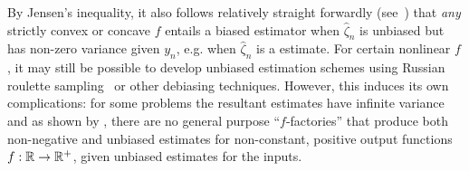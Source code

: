 By Jensen's inequality, it also follows relatively straight forwardly (see~\cite{rainforth2017pitfalls}) 
that \emph{any} strictly convex or concave $f$  entails a biased estimator 
when $\hat{\zeta}_n$ is unbiased but has non-zero variance given $y_n$, e.g.
when $\hat{\zeta}_n$ is a \mc estimate.
For certain nonlinear $f$, it may still be possible to develop unbiased estimation
schemes using Russian roulette sampling~\citep{lyne2015russian} or other debiasing techniques.  
However, this induces its own complications: for some problems the resultant estimates
have infinite variance \citep{lyne2015russian} and as shown by \cite{jacob2015nonnegative}, there are 
no general purpose ``$f$-factories'' that produce both non-negative and
unbiased estimates for non-constant, positive output functions $f : \mathbb{R} \rightarrow \mathbb{R}^+$,
given unbiased estimates for the inputs.

